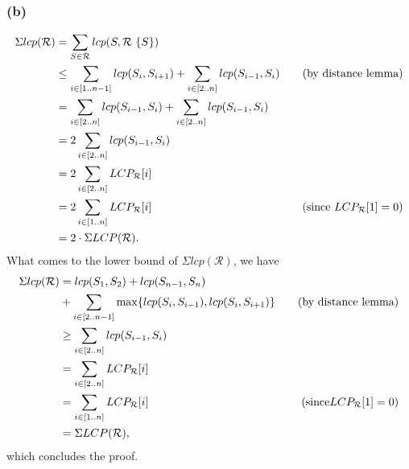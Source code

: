 \documentclass[10pt]{article}
\begin{document}
\subsubsection*{(b)}
\begin{align*}
\Sigma lcp(\mathcal{R}) &= \sum_{S \in \mathcal{R}} lcp(S, \mathcal{R} \ \{ S \}) \\
									  &\leq \sum_{i \in [1 .. n - 1]} lcp(S_i, S_{i + 1}) + \sum_{i \in [2 .. n]} lcp(S_{i - 1}, S_i) &\text{\quad (by distance lemma)} \\
									  &= \sum_{i \in [2 .. n]} lcp(S_{i - 1}, S_i) + \sum_{i \in [2 .. n]} lcp(S_{i - 1}, S_i) \\
									  &= 2 \sum_{i \in [2 .. n]} lcp(S_{i - 1}, S_i) \\
									  &= 2 \sum_{i \in [2 .. n]} LCP_{\mathcal{R}}[i] \\
									  &= 2 \sum_{i \in [1 .. n]} LCP_{\mathcal{R}}[i] & \text{\quad (since } LCP_{\mathcal{R}}[1] = 0) \\
									  &= 2 \cdot \Sigma LCP(\mathcal{R}).
\end{align*}
What comes to the lower bound of $\Sigma lcp(\mathcal{R})$, we have
\begin{align*}
\Sigma lcp(\mathcal{R}) &= lcp(S_1, S_2) + lcp(S_{n - 1}, S_n) \\
 									  &+ \sum_{i \in [2 .. n - 1]} \max \{ lcp(S_i, S_{i - 1}), lcp(S_i, S_{i + 1}) \} &\text{\quad (by distance lemma)} \\
    								  &\geq \sum_{i \in [2 .. n]} lcp(S_{i - 1}, S_i) \\
    								  &= \sum_{i \in [2 .. n]} LCP_{\mathcal{R}}[i] \\
    								  &= \sum_{i \in [1 .. n]} LCP_{\mathcal{R}}[i] & \text{\quad (since} LCP_{\mathcal{R}}[1] = 0) \\
    								  &= \Sigma LCP(\mathcal{R}),
\end{align*}
which concludes the proof.
\end{document}
